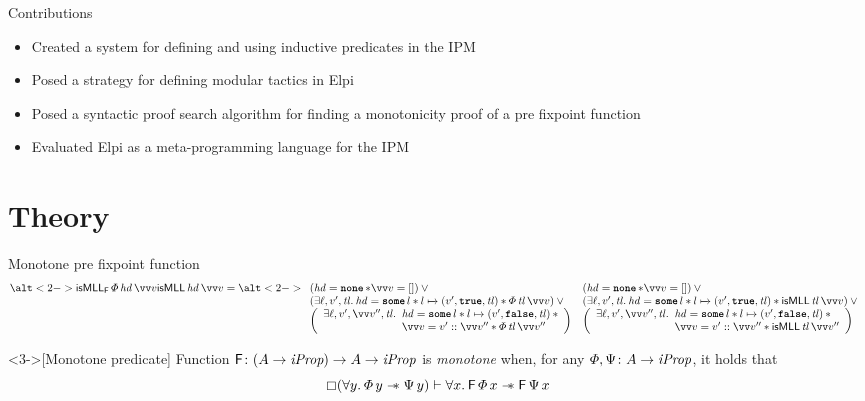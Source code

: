\documentclass[aspectratio=169]{beamer}
\begin{document}
\begin{frame}{Contributions}
    \pause
    \begin{itemize}[<+->]
        \item Created a system for defining and using inductive predicates in the IPM
        \item Posed a strategy for defining modular tactics in Elpi
        \item Posed a syntactic proof search algorithm for finding a monotonicity proof of a pre fixpoint function
        \item Evaluated Elpi as a meta-programming language for the IPM
    \end{itemize}
\end{frame}

\section{Theory}
\begin{frame}{Monotone pre fixpoint function}
    \begin{align*}
        \alt<2->
        {\isMLL_{\hopred}\, \pred\, \hd\, \vect{\val}}{\isMLL\, \hd\, \vect{\val}} = \alt<2->{\isMLLFDef}{\isMLLRecDef}
    \end{align*}

    \begin{definition}<3->[Monotone predicate]
        Function $\textsf{\upshape F}\colon (A \to \textit{iProp}) \to  A \to \textit{iProp}$ is \emph{monotone} when, for any $\varPhi, \Psi\colon A \to \textit{iProp}$, it holds that
        \[ \always(\All \varB. \pred\,\varB \wand \predB\,\varB) \proves \All \var. \hopred\,\pred\,\var \wand \hopred\,\predB\,\var\]
    \end{definition}
\end{frame}
\end{document}
